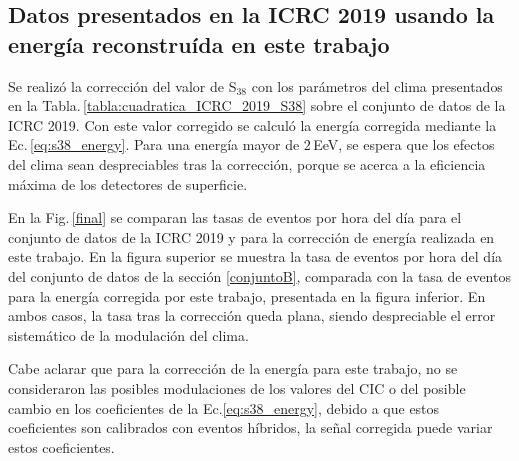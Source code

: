 

\subsection{Datos presentados en la ICRC 2019 usando la energía reconstruída en este trabajo}

Se realizó la corrección del valor de S$_{38}$ con los parámetros del clima presentados en la Tabla.\,\ref{tabla:cuadratica_ICRC_2019_S38} sobre el conjunto de datos de la ICRC 2019. Con este valor corregido se calculó la energía corregida mediante la Ec.\,\ref{eq:s38_energy}. Para una energía mayor de $2\,$EeV, se espera que los efectos del clima sean despreciables tras la corrección, porque se acerca a la eficiencia máxima de los detectores de superficie. %

En la Fig.\,\ref{final} se comparan las tasas de eventos por hora del día para el conjunto de datos de la ICRC 2019 y para la corrección de energía realizada en este trabajo. En la figura superior se muestra la tasa de eventos por hora del día del conjunto de datos de la sección \ref{conjuntoB}, comparada con la tasa de eventos para la energía corregida por este trabajo, presentada en la figura inferior. En ambos casos, la tasa tras la corrección queda plana, siendo despreciable el error sistemático de la modulación del clima.

Cabe aclarar que para la corrección de la energía para este trabajo, no se consideraron las posibles modulaciones de los valores del CIC o del posible cambio en los coeficientes de la Ec.\ref{eq:s38_energy}, debido a que estos coeficientes son calibrados con eventos híbridos, la señal corregida puede variar estos coeficientes.


